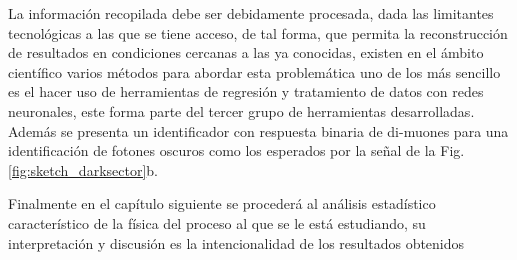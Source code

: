 


La información recopilada debe ser debidamente procesada, dada las limitantes tecnológicas a las que se tiene acceso, de tal forma, que permita la reconstrucción de resultados en condiciones cercanas a las ya conocidas, existen en el ámbito científico varios métodos para abordar esta problemática uno de los más sencillo es el hacer uso de herramientas de regresión y tratamiento de datos con redes neuronales, este forma parte del tercer grupo de herramientas desarrolladas. Además se presenta un identificador con respuesta binaria de di-muones para una identificación de fotones oscuros como los esperados por la señal de la Fig. \ref{fig:sketch_darksector}b.

Finalmente en el capítulo siguiente se procederá al análisis estadístico característico de la física del proceso al que se le está estudiando, su interpretación y discusión es la intencionalidad de los resultados obtenidos 





